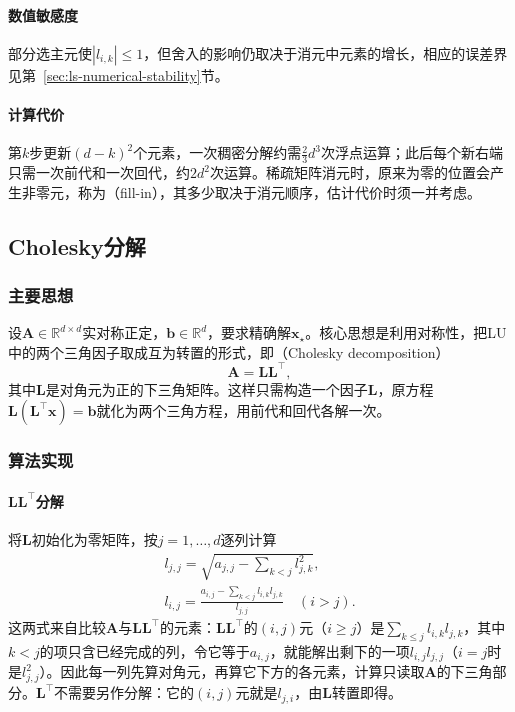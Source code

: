 \paragraph{数值敏感度}
部分选主元使$|l_{i,k}|\leq1$，但舍入的影响仍取决于消元中元素的增长，相应的误差界见第~\ref{sec:ls-numerical-stability}节。

\paragraph{计算代价}
第$k$步更新$(d-k)^2$个元素，一次稠密分解约需$\tfrac23d^3$次浮点运算；此后每个新右端只需一次前代和一次回代，约$2d^2$次运算。稀疏矩阵消元时，原来为零的位置会产生非零元，称为（fill-in），其多少取决于消元顺序，估计代价时须一并考虑。

\subsection{Cholesky分解}
\label{sec:ls-cholesky}

\subsubsection{主要思想}
设$\bm A\in\mathbb R^{d\times d}$实对称正定，$\bm b\in\mathbb R^d$，要求精确解$\bm x_\star$。核心思想是利用对称性，把LU中的两个三角因子取成互为转置的形式，即（Cholesky decomposition）
\begin{equation}
 \bm A=\bm L\bm L^\top,
 \label{eq:matrix-analysis-cholesky}
\end{equation}
其中$\bm L$是对角元为正的下三角矩阵。这样只需构造一个因子$\bm L$，原方程$\bm L(\bm L^\top\bm x)=\bm b$就化为两个三角方程，用前代和回代各解一次。

\subsubsection{算法实现}
\paragraph{$\bm L\bm L^\top$分解}
将$\bm L$初始化为零矩阵，按$j=1,\ldots,d$逐列计算
\begin{equation}
\begin{gathered}
 l_{j,j}=\sqrt{a_{j,j}-\sum_{k<j}l_{j,k}^2},\\
 l_{i,j}=\frac{a_{i,j}-\sum_{k<j}l_{i,k}l_{j,k}}{l_{j,j}}\quad(i>j).
\end{gathered}
\label{eq:ls-cholesky-columns}
\end{equation}
这两式来自比较$\bm A$与$\bm L\bm L^\top$的元素：$\bm L\bm L^\top$的$(i,j)$元（$i\geq j$）是$\sum_{k\leq j}l_{i,k}l_{j,k}$，其中$k<j$的项只含已经完成的列，令它等于$a_{i,j}$，就能解出剩下的一项$l_{i,j}l_{j,j}$（$i=j$时是$l_{j,j}^2$）。因此每一列先算对角元，再算它下方的各元素，计算只读取$\bm A$的下三角部分。$\bm L^\top$不需要另作分解：它的$(i,j)$元就是$l_{j,i}$，由$\bm L$转置即得。

